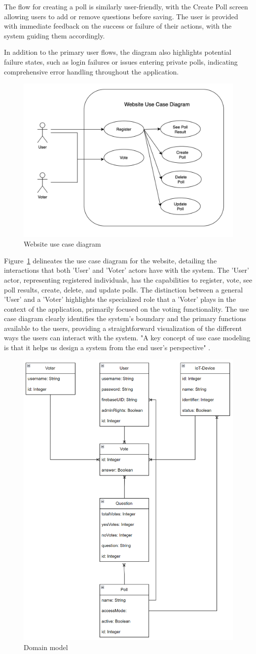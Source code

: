 The flow for creating a poll is similarly user-friendly, with the Create Poll screen allowing users to add or remove questions before saving. The user is provided with immediate feedback on the success or failure of their actions, with the system guiding them accordingly.

In addition to the primary user flows, the diagram also highlights potential failure states, such as login failures or issues entering private polls, indicating comprehensive error handling throughout the application.
    


\begin{figure}[!htbp]
\centering
\includegraphics[width=0.5\linewidth]{figs/UserDiagram.png}
\caption{Website use case diagram}
\label{fig:userdiagram}
\end{figure}

Figure~\ref{fig:userdiagram} delineates the use case diagram for the website, detailing the interactions that both 'User' and 'Voter' actors have with the system. The 'User' actor, representing registered individuals, has the capabilities to register, vote, see poll results, create, delete, and update polls. The distinction between a general 'User' and a 'Voter' highlights the specialized role that a 'Voter' plays in the context of the application, primarily focused on the voting functionality. The use case diagram clearly identifies the system's boundary and the primary functions available to the users, providing a straightforward visualization of the different ways the users can interact with the system. "A key concept of use case modeling is that it helps us design a system from the end user's perspective" \cite{visualparadigm2023}.


\begin{figure}[!htbp]
\centering
\includegraphics[width=0.4\linewidth]{figs/DomainModel.png}
\caption{Domain model}
\label{fig:domainmodel}
\end{figure}

